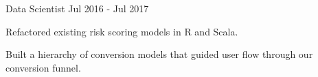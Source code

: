 \begin{cventries}
\cventry
{Data Scientist} %
{} %
{} %
{Jul 2016 - Jul 2017}
{ %
\begin{cvitems}
\item {Refactored existing risk scoring models in R and Scala.}
\item {Built a hierarchy of conversion models that guided user flow through our conversion funnel.}
\end{cvitems}
}

\end{cventries}